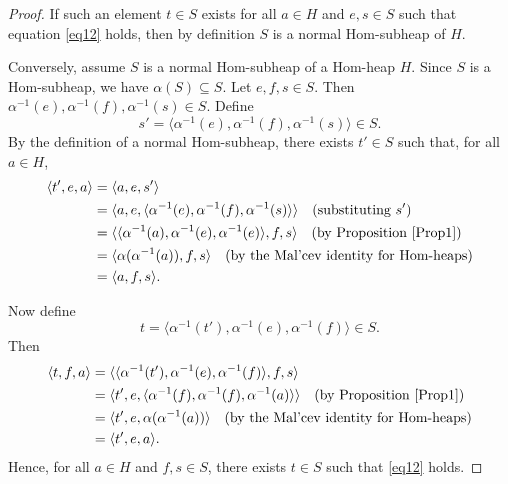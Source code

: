 \documentclass[14pt]{article}
\theoremstyle{Definition}
\theoremstyle{remark}
\begin{document}
\begin{proof}
If such an element $t \in S$ exists for all $a \in H$ and $e, s \in S$ such that equation \eqref{eq12} holds, then by definition $S$ is a normal Hom-subheap of $H$.

Conversely, assume $S$ is a normal Hom-subheap of a Hom-heap $H$. Since $S$ is a Hom-subheap, we have $\alpha(S) \subseteq S$.  
Let $e, f, s \in S$. Then $\alpha^{-1}(e), \alpha^{-1}(f), \alpha^{-1}(s) \in S$. Define
\[
s' = \langle \alpha^{-1}(e), \alpha^{-1}(f), \alpha^{-1}(s) \rangle \in S.
\]
By the definition of a normal Hom-subheap, there exists $t' \in S$ such that, for all $a \in H$,
\begin{align*}
\langle t', e, a \rangle 
&= \langle a, e, s' \rangle \\
&= \langle a, e, \langle \alpha^{-1}(e), \alpha^{-1}(f), \alpha^{-1}(s) \rangle \rangle \quad \text{(substituting $s'$)} \\
&= \langle \langle \alpha^{-1}(a), \alpha^{-1}(e), \alpha^{-1}(e) \rangle, f, s \rangle \quad \text{(by Proposition~\ref{Prop1})} \\
&= \langle \alpha(\alpha^{-1}(a)), f, s \rangle \quad \text{(by the Mal'cev identity for Hom-heaps)} \\
&= \langle a, f, s \rangle.
\end{align*}

Now define
\[
t = \langle \alpha^{-1}(t'), \alpha^{-1}(e), \alpha^{-1}(f) \rangle \in S.
\]
Then
\begin{align*}
\langle t, f, a \rangle 
&= \langle \langle \alpha^{-1}(t'), \alpha^{-1}(e), \alpha^{-1}(f) \rangle, f, s \rangle \\
&= \langle t', e, \langle \alpha^{-1}(f), \alpha^{-1}(f), \alpha^{-1}(a) \rangle \rangle \quad \text{(by Proposition~\ref{Prop1})} \\
&= \langle t', e, \alpha(\alpha^{-1}(a)) \rangle \quad \text{(by the Mal'cev identity for Hom-heaps)} \\
&= \langle t', e, a \rangle.
\end{align*}
Hence, for all $a \in H$ and $f, s \in S$, there exists $t \in S$ such that \eqref{eq12} holds.
\end{proof}
\end{document}
